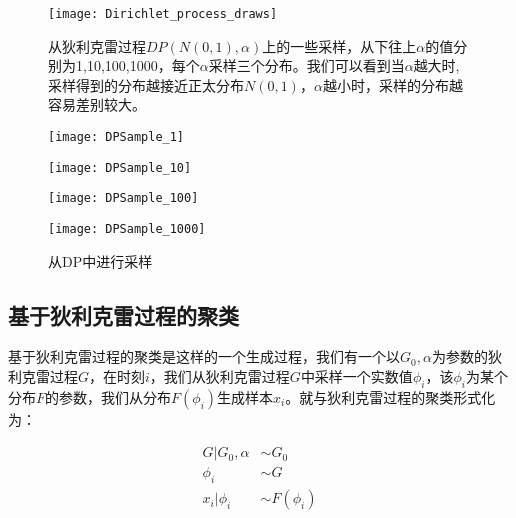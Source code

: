 \begin{figure}[htbp]
\centering
\texttt{[image: Dirichlet\_process\_draws]}
\caption{从狄利克雷过程$DP(N(0,1), \alpha)$上的一些采样，从下往上$\alpha$的值分别为1,10,100,1000，每个$\alpha$采样三个分布。我们可以看到当$\alpha$越大时,采样得到的分布越接近正太分布$N(0,1)$，$\alpha$越小时，采样的分布越容易差别较大。}
\end{figure}

\begin{figure}[htbp]
\centering
\begin{subfloat}
\centering
\texttt{[image: DPSample\_1]}
\end{subfloat}
\begin{subfloat}
\centering
\texttt{[image: DPSample\_10]}
\end{subfloat}
\begin{subfloat}
\centering
\texttt{[image: DPSample\_100]}
\end{subfloat}
\begin{subfloat}
\centering
\texttt{[image: DPSample\_1000]}
\end{subfloat}
\caption{从DP中进行采样}
\end{figure}



\subsection{基于狄利克雷过程的聚类}

基于狄利克雷过程的聚类是这样的一个生成过程，我们有一个以$G_0,\alpha$为参数的狄利克雷过程$G$，在时刻$i$，我们从狄利克雷过程$G$中采样一个实数值$\phi_i$，该$\phi_i$为某个分布$F$的参数，我们从分布$F(\phi_i)$生成样本$x_i$。就与狄利克雷过程的聚类形式化为：

\begin{displaymath}
\begin{split}
G|G_0,\alpha &\sim G_0\\
\phi_i &\sim G\\
x_i|\phi_i &\sim F(\phi_i)\\
\end{split}
\end{displaymath}


